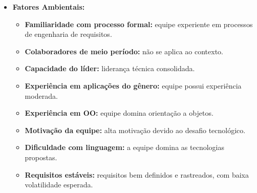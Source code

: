 \begin{itemize}
\item \textbf{Fatores Ambientais:}
\begin{itemize}
    \item \textbf{Familiaridade com processo formal:} equipe experiente em processos de engenharia de requisitos.
    \item \textbf{Colaboradores de meio período:} não se aplica ao contexto.
    \item \textbf{Capacidade do líder:} liderança técnica consolidada.
    \item \textbf{Experiência em aplicações do gênero:} equipe possui experiência moderada.
    \item \textbf{Experiência em OO:} equipe domina orientação a objetos.
    \item \textbf{Motivação da equipe:} alta motivação devido ao desafio tecnológico.
    \item \textbf{Dificuldade com linguagem:} a equipe domina as tecnologias propostas.
    \item \textbf{Requisitos estáveis:} requisitos bem definidos e rastreados, com baixa volatilidade esperada.
\end{itemize}
\end{itemize}

